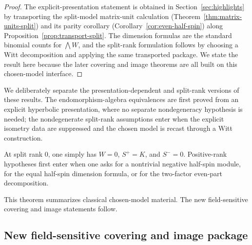 \documentclass{birkjour}
\theoremstyle{plain}
\theoremstyle{definition}
\theoremstyle{remark}
\numberwithin{equation}{section}
\begin{document}
\begin{proof}
The explicit-presentation statement is obtained in
Section~\ref{sec:highlights} by transporting the split-model matrix-unit
calculation (Theorem~\ref{thm:matrix-units-split}) and its parity corollary
(Corollary~\ref{cor:even-half-spin}) along
Proposition~\ref{prop:transport-split}. The dimension formulas are the standard
binomial counts for $\bigwedge W$, and the split-rank formulation follows by
choosing a Witt decomposition and applying the same transported package. We
state the result here because the later covering and image theorems are all
built on this chosen-model interface.
\end{proof}

We deliberately separate the presentation-dependent and split-rank
versions of these results. The endomorphism-algebra equivalences are
first proved from an explicit hyperbolic presentation, where no separate
nondegeneracy hypothesis is needed; the nondegenerate split-rank assumptions
enter when the explicit isometry data are suppressed and the chosen model is
recast through a Witt construction.

At split rank $0$, one simply has $W=0$, $S^+=K$, and $S^-=0$. Positive-rank
hypotheses first enter when one asks for a nontrivial negative half-spin module,
for the equal half-spin dimension formula, or for the two-factor even-part
decomposition.

This theorem summarizes classical chosen-model material. The new field-sensitive
covering and image statements follow.

\subsection*{New field-sensitive covering and image package}
\end{document}
